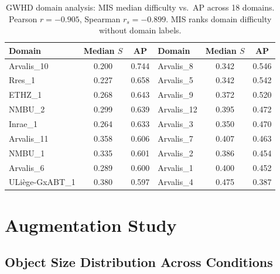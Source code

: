 \documentclass[10pt, a4paper]{article}
\begin{document}
\begin{table}[H]
\centering
\small
\caption{GWHD domain analysis: MIS median difficulty vs.\ AP across
  18 domains. Pearson $r=-0.905$, Spearman $r_s=-0.899$.
  MIS ranks domain difficulty without domain labels.}
\begin{tabular}{lcc||lcc}
\toprule
\textbf{Domain} & \textbf{Median $S$} & \textbf{AP}
  & \textbf{Domain} & \textbf{Median $S$} & \textbf{AP} \\
\midrule
Arvalis\_10     & 0.200 & 0.744 & Arvalis\_8      & 0.342 & 0.546 \\
Rres\_1         & 0.227 & 0.658 & Arvalis\_5      & 0.342 & 0.542 \\
ETHZ\_1         & 0.268 & 0.643 & Arvalis\_9      & 0.372 & 0.520 \\
NMBU\_2         & 0.299 & 0.639 & Arvalis\_12     & 0.395 & 0.472 \\
Inrae\_1        & 0.264 & 0.633 & Arvalis\_3      & 0.350 & 0.470 \\
Arvalis\_11     & 0.358 & 0.606 & Arvalis\_7      & 0.407 & 0.463 \\
NMBU\_1         & 0.335 & 0.601 & Arvalis\_2      & 0.386 & 0.454 \\
Arvalis\_6      & 0.289 & 0.600 & Arvalis\_1      & 0.400 & 0.452 \\
ULiège-GxABT\_1 & 0.380 & 0.597 & Arvalis\_4      & 0.475 & 0.387 \\
\bottomrule
\end{tabular}
\end{table}

\section{Augmentation Study}

\subsection{Object Size Distribution Across Conditions}
\end{document}
